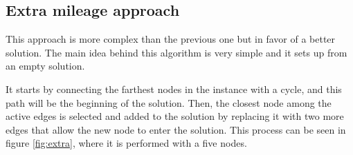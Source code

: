 \subsection{Extra mileage approach}
\label{sec:extra-mileage}
This approach is more complex than the previous one but in favor of a better solution. The main idea behind this algorithm is very simple and it sets up from an empty solution.

It starts by connecting the farthest nodes in the instance with a cycle, and this path will be the beginning of the solution. Then, the closest node among the active edges is selected and added to the solution by replacing it with two more edges that allow the new node to enter the solution. This process can be seen in figure \ref{fig:extra}, where it is performed with a five nodes.

